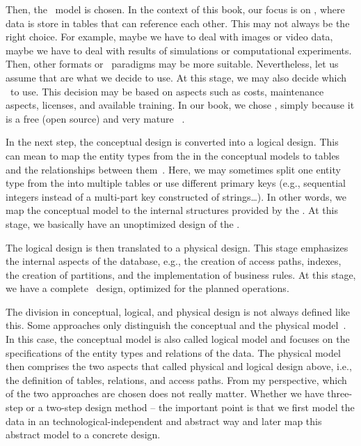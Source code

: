Then, the \db\ model is chosen.
In the context of this book, our focus is on , where data is store in tables that can reference each other.
This may not always be the right choice.
For example, maybe we have to deal with images or video data, maybe we have to deal with results of simulations or computational experiments.
Then, other formats or \db\ paradigms may be more suitable.
Nevertheless, let us assume that  are what we decide to use.
At this stage, we may also decide which \dbms\ to use.
This decision may be based on aspects such as costs, maintenance aspects, licenses, and available training.
In our book, we chose \postgresql, simply because it is a free (open source) and very mature \sql\ \dbms.

In the next step, the conceptual design is converted into a logical design.
This can mean to map the entity types from the  in the conceptual models to tables and the relationships between them~\cite{SS2005EIDDDFDB:I,SS2005EIDDDFDB:CDDRAAML}.
Here, we may sometimes split one entity type from the  into multiple tables or use different primary keys (e.g., sequential integers instead of a multi-part key constructed of strings\dots).
In other words, we map the conceptual model to the internal structures provided by the \dbms.
At this stage, we basically have an unoptimized design of the \db.

The logical design is then translated to a physical design.
This stage emphasizes the internal aspects of the database, e.g., the creation of access paths, indexes, the creation of partitions, and the implementation of business rules.
At this stage, we have a complete \db\ design, optimized for the planned operations.

The division in conceptual, logical, and physical design is not always defined like this.
Some approaches only distinguish the conceptual and the physical model~\cite{G2011EW2ITDS:ITRD,V1999C5DMS:CI}.
In this case, the conceptual model is also called logical model and focuses on the specifications of the entity types and relations of the data.
The physical model then comprises the two aspects that called physical and logical design above, i.e., the definition of tables, relations, and access paths.
From my perspective, which of the two approaches are chosen does not really matter.
Whether we have three-step or a two-step design method -- the important point is that we first model the data in an technological-independent and abstract way and later map this abstract model to a concrete design.

